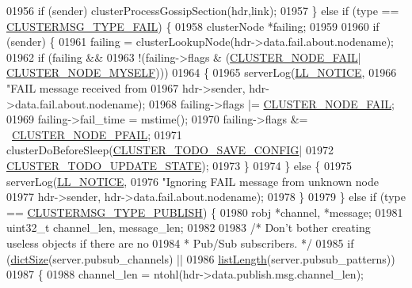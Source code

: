 \begin{DoxyCode}
{{{{{{{{{{{{{{{{{{{{{{{{{{{{{{{{01956         \textcolor{keywordflow}{if} (sender) clusterProcessGossipSection(hdr,link);
01957     \} \textcolor{keywordflow}{else} \textcolor{keywordflow}{if} (type == \hyperlink{cluster_8h_af5d51e3ad9965074b2124aabe1895d59}{CLUSTERMSG\_TYPE\_FAIL}) \{
01958         clusterNode *failing;
01959 
01960         \textcolor{keywordflow}{if} (sender) \{
01961             failing = clusterLookupNode(hdr->data.fail.about.nodename);
01962             \textcolor{keywordflow}{if} (failing &&
01963                 !(failing->flags & (\hyperlink{cluster_8h_ad211e85c7baf8a5a59acd747e4e9005a}{CLUSTER\_NODE\_FAIL}|
      \hyperlink{cluster_8h_afee946c4e74c08465e9b4ead5e3659e6}{CLUSTER\_NODE\_MYSELF})))
01964             \{
01965                 serverLog(\hyperlink{server_8h_a8c54c191e436c7dd3012167212692401}{LL\_NOTICE},
01966                     \textcolor{stringliteral}{"FAIL message received from %
01967                     hdr->sender, hdr->data.fail.about.nodename);
01968                 failing->flags |= \hyperlink{cluster_8h_ad211e85c7baf8a5a59acd747e4e9005a}{CLUSTER\_NODE\_FAIL};
01969                 failing->fail\_time = mstime();
01970                 failing->flags &= ~\hyperlink{cluster_8h_a5306c1ae8988b8be0a1a02bd9162dfa1}{CLUSTER\_NODE\_PFAIL};
01971                 clusterDoBeforeSleep(\hyperlink{cluster_8h_a0ae5ff08fbae3c655012b4de8bfc327d}{CLUSTER\_TODO\_SAVE\_CONFIG}|
01972                                      \hyperlink{cluster_8h_abea0d393cba342261e4a7e6fb745f388}{CLUSTER\_TODO\_UPDATE\_STATE});
01973             \}
01974         \} \textcolor{keywordflow}{else} \{
01975             serverLog(\hyperlink{server_8h_a8c54c191e436c7dd3012167212692401}{LL\_NOTICE},
01976                 \textcolor{stringliteral}{"Ignoring FAIL message from unknown node %
01977                 hdr->sender, hdr->data.fail.about.nodename);
01978         \}
01979     \} \textcolor{keywordflow}{else} \textcolor{keywordflow}{if} (type == \hyperlink{cluster_8h_a874fecfd3ff886c2c697f5649ebee5ee}{CLUSTERMSG\_TYPE\_PUBLISH}) \{
01980         robj *channel, *message;
01981         uint32\_t channel\_len, message\_len;
01982 
01983         \textcolor{comment}{/* Don't bother creating useless objects if there are no}
01984 \textcolor{comment}{         * Pub/Sub subscribers. */}
01985         \textcolor{keywordflow}{if} (\hyperlink{dict_8h_af193430dd3d5579a52b194512f72c1f0}{dictSize}(server.pubsub\_channels) ||
01986            \hyperlink{adlist_8h_afde0ab079f934670e82119b43120e94b}{listLength}(server.pubsub\_patterns))
01987         \{
01988             channel\_len = ntohl(hdr->data.publish.msg.channel\_len);
}}}}}}}}}}}}}}}}}}}}}}}}}}}}}}}}}}
\end{DoxyCode}
